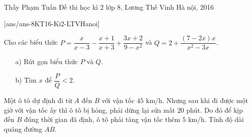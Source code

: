 \begin{name}
{Thầy  Phạm Tuấn}
{Đề thi học kì 2 lớp 8, Lương Thế Vinh Hà nội, 2016}
\end{name}
\setcounter{ex}{0}
[ans/ans-8KT16-Ki2-LTVHanoi]
\begin{ex}%
Cho các biểu thức $P=\dfrac{x}{x-3} - \dfrac{x+1}{x+3}+\dfrac{3x+2}{9-x^2}$ và $Q= 2+ \dfrac{(7-2x)x}{x^2-3x}$.
\begin{enumerate}
\item[a)] Rút gọn biểu thức $P$ và $Q$. 
\item[b)] Tìm $x$ để $\dfrac{P}{Q} <2$.
\end{enumerate}
\end{ex}

\begin{ex}%
Một ô tô dự định đi từ $A$ đến $B$ với vận tốc $45$ km/h. Nhưng sau khi đi được một giờ với vận tốc ấy thì ô tô bị hỏng, phải dừng lại sửa mất $20$ phút. Do đó để kịp đến $B$ đúng thời gian đã định, ô tô phải  tăng vận tốc thêm $5$ km/h. Tính độ dài quãng đường $AB$. 
\end{ex}

